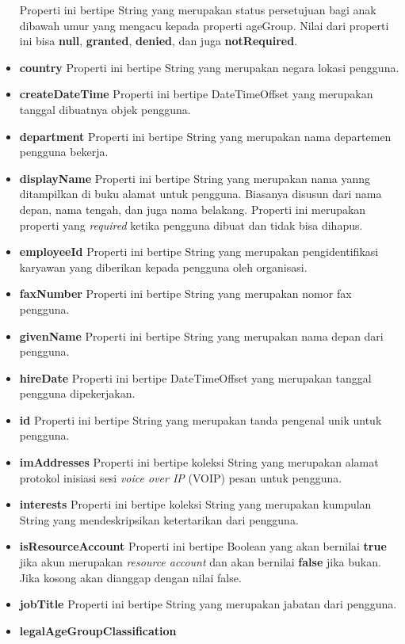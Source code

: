 \begin{itemize}
	Properti ini bertipe String yang merupakan status persetujuan bagi anak dibawah umur yang mengacu kepada properti ageGroup. Nilai dari properti ini bisa \textbf{null}, \textbf{granted}, \textbf{denied}, dan juga \textbf{notRequired}. 
	\item \textbf{country}
	Properti ini bertipe String yang merupakan negara lokasi pengguna.
	\item \textbf{createDateTime}
	Properti ini bertipe DateTimeOffset yang merupakan tanggal dibuatnya objek pengguna.
	\item \textbf{department}
	Properti ini bertipe String yang merupakan nama departemen pengguna bekerja.
	\item \textbf{displayName}
	Properti ini bertipe String yang merupakan nama yanng ditampilkan di buku alamat untuk pengguna. Biasanya disusun dari nama depan, nama tengah, dan juga nama belakang. Properti ini merupakan properti yang \textit{required} ketika pengguna dibuat dan tidak bisa dihapus. 
	 \item \textbf{employeeId}
	Properti ini bertipe String yang merupakan pengidentifikasi karyawan yang diberikan kepada pengguna oleh organisasi.
	\item \textbf{faxNumber}
	Properti ini bertipe String yang merupakan nomor fax pengguna.
	\item \textbf{givenName}
	Properti ini bertipe String yang merupakan nama depan dari pengguna.
	\item \textbf{hireDate}
	Properti ini bertipe DateTimeOffset yang merupakan tanggal pengguna dipekerjakan.
	\item \textbf{id}
	Properti ini bertipe String yang merupakan tanda pengenal unik untuk pengguna.
	\item \textbf{imAddresses}
	Properti ini bertipe koleksi String yang merupakan alamat protokol inisiasi sesi \textit{voice over IP} (VOIP) pesan untuk pengguna.
	\item \textbf{interests}
	Properti ini bertipe koleksi String yang merupakan kumpulan String yang mendeskripsikan ketertarikan dari pengguna.
	\item \textbf{isResourceAccount}
	Properti ini bertipe Boolean yang akan bernilai \textbf{true} jika akun merupakan \textit{resource account} dan akan bernilai \textbf{false} jika bukan. Jika kosong akan dianggap dengan nilai false.
	\item \textbf{jobTitle}
	Properti ini bertipe String yang merupakan jabatan dari pengguna.
	\item \textbf{legalAgeGroupClassification}

\end{itemize}
